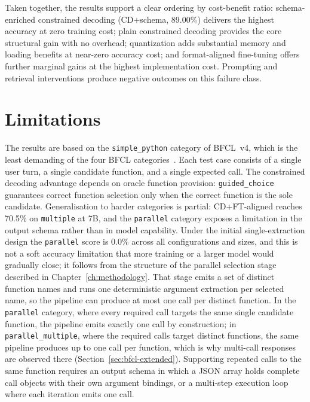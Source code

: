 Taken together, the results support a clear ordering by cost-benefit ratio:
schema-enriched constrained decoding (CD+schema, 89.00\%) delivers the highest
accuracy at zero training cost; plain constrained decoding provides the core
structural gain with no overhead; quantization adds substantial memory and
loading benefits at near-zero accuracy cost; and format-aligned fine-tuning
offers further marginal gains at the highest implementation cost. Prompting
and retrieval interventions produce negative outcomes on this failure class.

\section{Limitations}

The results are based on the \texttt{simple\_python} category of BFCL~v4,
which is the least demanding of the four BFCL categories~\cite{bfcl2024}.
Each test case consists of a single user turn, a single candidate function,
and a single expected call. The constrained decoding advantage depends on
oracle function provision: \texttt{guided\_choice} guarantees correct
function selection only when the correct function is the sole candidate.
Generalisation to harder categories is partial: CD+FT-aligned reaches
70.5\% on \texttt{multiple} at 7B, and the \texttt{parallel} category
exposes a limitation in the output schema rather than in model
capability. Under the initial single-extraction design the
\texttt{parallel} score is 0.0\% across all configurations and sizes,
and this is not a soft accuracy limitation that more training or a
larger model would gradually close; it follows from the structure of
the parallel selection stage described in Chapter~\ref{ch:methodology}.
That stage emits a set of distinct function names and runs one
deterministic argument extraction per selected name, so the pipeline can
produce at most one call per distinct function. In the \texttt{parallel}
category, where every required call targets the same single candidate
function, the pipeline emits exactly one call by construction; in
\texttt{parallel\_multiple}, where the required calls target distinct
functions, the same pipeline produces up to one call per function,
which is why multi-call responses are observed there
(Section~\ref{sec:bfcl-extended}). Supporting repeated calls to the
same function requires an output schema in which a JSON array holds
complete call objects with their own argument bindings, or a multi-step
execution loop where each iteration emits one call.

